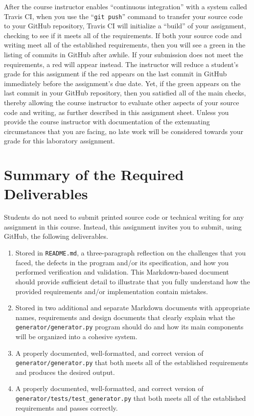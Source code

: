 \documentclass[11pt]{article}
\newcommand{\mainprogramsource}{\lstinline{generator/generator.py}}
\newcommand{\maintestsource}{\lstinline{generator/tests/test_generator.py}}
\newcommand{\reflection}{\lstinline{README.md}}
\newcommand{\gitpush}{\command{git push}}
\newcommand{\command}[1]{``\lstinline{#1}''}
\newcommand{\step}[1]{``{#1}''}
\newcommand{\checkmark}{\ding{51}}
\newcommand{\naughtmark}{\ding{55}}
\begin{document}
After the course instructor enables \step{continuous integration} with a system called Travis CI, when you use the
\gitpush{} command to transfer your source code to your GitHub repository, Travis CI will initialize a \step{build} of
your assignment, checking to see if it meets all of the requirements. If both your source code and writing meet all of
the established requirements, then you will see a green \checkmark{} in the listing of commits in GitHub after awhile.
If your submission does not meet the requirements, a red \naughtmark{} will appear instead. The instructor will reduce a
student's grade for this assignment if the red \naughtmark{} appears on the last commit in GitHub immediately before the
assignment's due date. Yet, if the green \checkmark{} appears on the last commit in your GitHub repository, then you
satisfied all of the main checks, thereby allowing the course instructor to evaluate other aspects of your source code
and writing, as further described in this assignment sheet. Unless you provide the course instructor with documentation
of the extenuating circumstances that you are facing, no late work will be considered towards your grade for this
laboratory assignment.

\section*{Summary of the Required Deliverables}

\noindent Students do not need to submit printed source code or technical writing for any assignment in this course.
Instead, this assignment invites you to submit, using GitHub, the following deliverables.

\begin{enumerate}

\setlength{\itemsep}{0in}

\item Stored in \reflection{}, a three-paragraph reflection on the challenges that you faced, the defects in the program
  and/or its specification, and how you performed verification and validation. This Markdown-based document should
  provide sufficient detail to illustrate that you fully understand how the provided requirements and/or implementation
  contain mistakes.

\item Stored in two additional and separate Markdown documents with appropriate names, requirements and design documents
  that clearly explain what the \mainprogramsource{} program should do and how its main components will be organized
  into a cohesive system.

\item A properly documented, well-formatted, and correct version of \mainprogramsource{} that both meets all of the
  established requirements and produces the desired output.

\item A properly documented, well-formatted, and correct version of \maintestsource{} that both meets all of the
  established requirements and passes correctly.

\end{enumerate}
\end{document}
